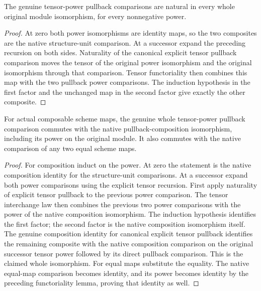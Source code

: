 \begin{lemma}\label{lem:actual-power-pullback-naturality}
\leanok
{}
The genuine tensor-power pullback comparisons are natural in every
whole original module isomorphism, for every nonnegative power.
\end{lemma}
\begin{proof}
At zero both power isomorphisms are identity maps, so the two
composites are the native structure-unit comparison. At a successor
expand the preceding recursion on both sides. Naturality of the
canonical explicit tensor pullback comparison moves the tensor of
the original power isomorphism and the original isomorphism through
that comparison. Tensor functoriality then combines this map with
the two pullback power comparisons. The induction hypothesis in
the first factor and the unchanged map in the second factor give
exactly the other composite.
\end{proof}

\begin{theorem}\label{thm:actual-power-pullback-composition}
\leanok
{}
For actual composable scheme maps, the genuine whole tensor-power
pullback comparison commutes with the native pullback-composition
isomorphism, including its power on the original module. It also
commutes with the native comparison of any two equal scheme maps.
\end{theorem}
\begin{proof}
For composition induct on the power. At zero the statement is the
native composition identity for the structure-unit comparisons.
At a successor expand both power comparisons using the explicit
tensor recursion. First apply naturality of explicit tensor
pullback to the previous power comparison. The tensor interchange
law then combines the previous two power comparisons with the
power of the native composition isomorphism. The induction
hypothesis identifies the first factor; the second factor is the
native composition isomorphism itself. The genuine composition
identity for canonical explicit tensor pullback identifies the
remaining composite with the native composition comparison on
the original successor tensor power followed by its direct
pullback comparison. This is the claimed whole isomorphism.
For equal maps substitute the equality. The native equal-map
comparison becomes identity, and its power becomes identity by
the preceding functoriality lemma, proving that identity as well.
\end{proof}
